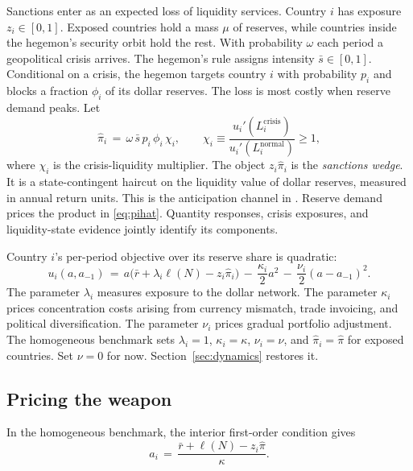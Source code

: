 \documentclass[11pt]{article}
\theoremstyle{definition}
\begin{document}
Sanctions enter as an expected loss of liquidity services. Country $i$ has exposure $z_i \in [0,1]$. Exposed countries hold a mass $\mu$ of reserves, while countries inside the hegemon's security orbit hold the rest. With probability $\omega$ each period a geopolitical crisis arrives. The hegemon's rule assigns intensity $\bar s \in [0,1]$. Conditional on a crisis, the hegemon targets country $i$ with probability $p_i$ and blocks a fraction $\phi_i$ of its dollar reserves. The loss is most costly when reserve demand peaks. Let
\begin{equation}
\hat\pi_i \,=\, \omega\,\bar s\,p_i\,\phi_i\,\chi_i,
\qquad
\chi_i \equiv \frac{u_i'(L_i^{\mathrm{crisis}})}{u_i'(L_i^{\mathrm{normal}})} \geq 1,
\label{eq:pihat}
\end{equation}
where $\chi_i$ is the crisis-liquidity multiplier. The object $z_i\hat\pi_i$ is the \emph{sanctions wedge}. It is a state-contingent haircut on the liquidity value of dollar reserves, measured in annual return units. This is the anticipation channel in \citet{BianchiSosaPadilla2025EJ}. Reserve demand prices the product in \eqref{eq:pihat}. Quantity responses, crisis exposures, and liquidity-state evidence jointly identify its components.

Country $i$'s per-period objective over its reserve share is quadratic:
\begin{equation}
u_i(a, a_{-1}) \,=\, a\big(\bar r + \lambda_i\ell(N) - z_i \hat\pi_i\big) \,-\, \frac{\kappa_i}{2}a^2 \,-\, \frac{\nu_i}{2}(a - a_{-1})^2 .
\label{eq:payoff}
\end{equation}
The parameter $\lambda_i$ measures exposure to the dollar network. The parameter $\kappa_i$ prices concentration costs arising from currency mismatch, trade invoicing, and political diversification. The parameter $\nu_i$ prices gradual portfolio adjustment. The homogeneous benchmark sets $\lambda_i=1$, $\kappa_i=\kappa$, $\nu_i=\nu$, and $\hat\pi_i=\hat\pi$ for exposed countries. Set $\nu=0$ for now. Section~\ref{sec:dynamics} restores it.

\subsection{Pricing the weapon}

In the homogeneous benchmark, the interior first-order condition gives
\begin{equation}
a_i \,=\, \frac{\bar r + \ell(N) - z_i \hat\pi}{\kappa}.
\label{eq:foc}
\end{equation}
\end{document}
